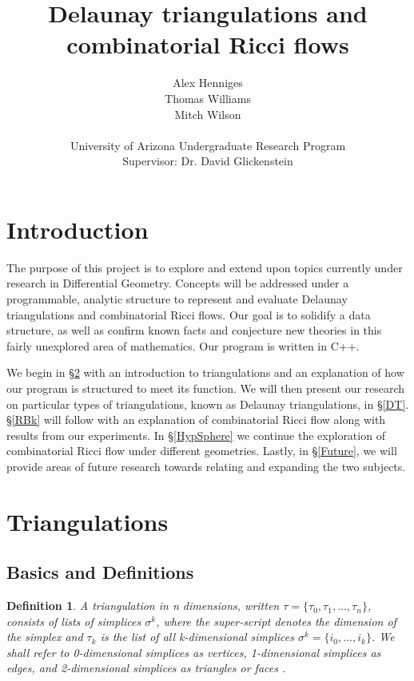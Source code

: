 \documentclass[12pt]{article}
\title{Delaunay triangulations and combinatorial Ricci flows}
\author{Alex Henniges \\ Thomas Williams \\ Mitch Wilson \\ \\ University of Arizona Undergraduate Research Program\\
Supervisor: Dr. David Glickenstein\\
}
\newtheorem{definition}[theorem]{Definition}
\begin{document}
\maketitle
\thispagestyle{empty}
\newpage
\renewcommand\contentsname{Table of Contents}
\tableofcontents

\newpage
\section{Introduction}

The purpose of this project is to explore and extend upon topics currently under research in Differential Geometry. Concepts will be addressed under a programmable, analytic structure to represent and evaluate Delaunay triangulations and combinatorial Ricci flows. Our goal is to solidify a data structure, as well as confirm known facts and conjecture new theories in this fairly unexplored area of mathematics. Our program is written in C++.\newline

 We begin in \S\ref{Triangulationschap} with an introduction to triangulations and an explanation of how our program is structured to meet its function. We will then present our research on particular types of triangulations, known as Delaunay triangulations, in \S\ref{DT}. \S\ref{RBk} will follow with an explanation of combinatorial Ricci flow along with results from our experiments. In \S\ref{HypSphere} we continue the exploration of combinatorial Ricci flow under different geometries. Lastly, in \S\ref{Future}, we will provide areas of future research towards relating and expanding the two subjects.

\section{Triangulations}
\label{Triangulationschap}

\subsection{Basics and Definitions}
\label{BaD}

\begin{definition}
\label{tridef}
A triangulation in \textit{n} dimensions, written $\tau = \{\tau_0, \tau_1, ... , \tau_n\}$, consists of lists of simplices $\sigma^k$, where the super-script denotes the dimension of the simplex and $\tau_k$ is the list of all \textit{k}-dimensional simplices $\sigma^k = \{i_0, ... , i_k\}$. We shall refer to 0-dimensional simplices as vertices, 1-dimensional simplices as edges, and 2-dimensional simplices as triangles or faces \cite{Dave}.
\end{definition}
\end{document}
